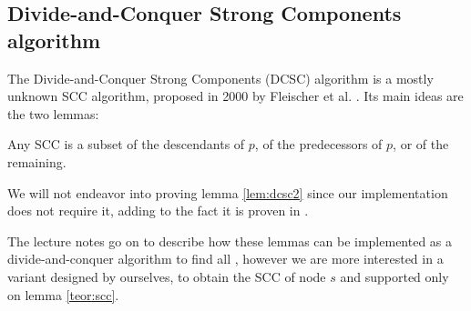 \subsection[DCSC algorithm]{Divide-and-Conquer Strong Components algorithm} \label{algorithm-scc-dcsc}
The Divide-and-Conquer Strong Components (DCSC) algorithm is a mostly unknown \acrshort{SCC} algorithm, proposed in 2000 by Fleischer et al. \cite{fleischer-dcsc}. Its main ideas are the two lemmas:
\begin{lemma} \label{lem:dcsc2}
    Any \acrshort{SCC} is a subset of the descendants of $p$, of the predecessors of $p$, or of the remaining.
\end{lemma}
We will not endeavor into proving lemma \ref{lem:dcsc2} since our implementation does not require it, adding to the fact it is proven in \cite{fleischer-dcsc}.\par
The lecture notes go on to describe how these lemmas can be implemented as a divide-and-conquer algorithm to find all , however we are more interested in a variant designed by ourselves, to obtain the \acrshort{SCC} of node $s$ and supported only on lemma \ref{teor:scc}.
